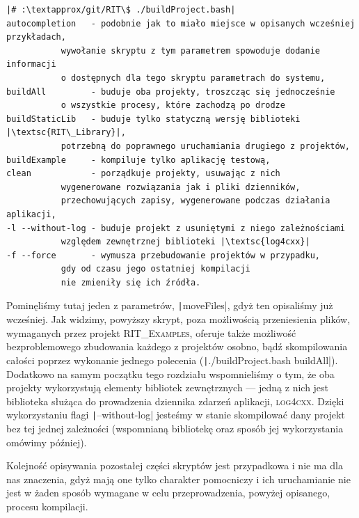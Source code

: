 \begin{verbatim}
|# :\textapprox/git/RIT\$ ./buildProject.bash|
autocompletion   - podobnie jak to miało miejsce w opisanych wcześniej przykładach, 
		   wywołanie skryptu z tym parametrem spowoduje dodanie informacji 
		   o dostępnych dla tego skryptu parametrach do systemu,
buildAll         - buduje oba projekty, troszcząc się jednocześnie 
		   o wszystkie procesy, które zachodzą po drodze
buildStaticLib   - buduje tylko statyczną wersję biblioteki |\textsc{RIT\_Library}|, 
		   potrzebną do poprawnego uruchamiania drugiego z projektów,
buildExample     - kompiluje tylko aplikację testową,
clean            - porządkuje projekty, usuwając z nich 
		   wygenerowane rozwiązania jak i pliki dzienników, 
		   przechowujących zapisy, wygenerowane podczas działania aplikacji,
-l --without-log - buduje projekt z usuniętymi z niego zależnościami
		   względem zewnętrznej biblioteki |\textsc{log4cxx}|
-f --force       - wymusza przebudowanie projektów w przypadku, 
		   gdy od czasu jego ostatniej kompilacji 
		   nie zmieniły się ich źródła.
\end{verbatim}

Pominęliśmy tutaj jeden z parametrów, \texttt|moveFiles|, gdyż ten opisaliśmy już wcześniej. Jak widzimy, powyższy skrypt, poza możliwością przeniesienia plików, wymaganych przez projekt \textsc{RIT\_Examples}, oferuje także możliwość bezproblemowego zbudowania każdego z projektów osobno, bądź skompilowania całości poprzez wykonanie jednego polecenia (\texttt|./buildProject.bash buildAll|). Dodatkowo na samym początku tego rozdziału wspomnieliśmy o tym, że oba projekty wykorzystują elementy bibliotek zewnętrznych --- jedną z nich jest biblioteka służąca do prowadzenia dziennika zdarzeń aplikacji, \textsc{log4cxx}. Dzięki wykorzystaniu flagi \texttt|--without-log| jesteśmy w stanie skompilować dany projekt bez tej jednej zależności (wspomnianą bibliotekę oraz sposób jej wykorzystania omówimy później).

Kolejność opisywania pozostałej części skryptów jest przypadkowa i nie ma dla nas znaczenia, gdyż mają one tylko charakter pomocniczy i ich uruchamianie nie jest w żaden sposób wymagane w celu przeprowadzenia, powyżej opisanego, procesu kompilacji.


